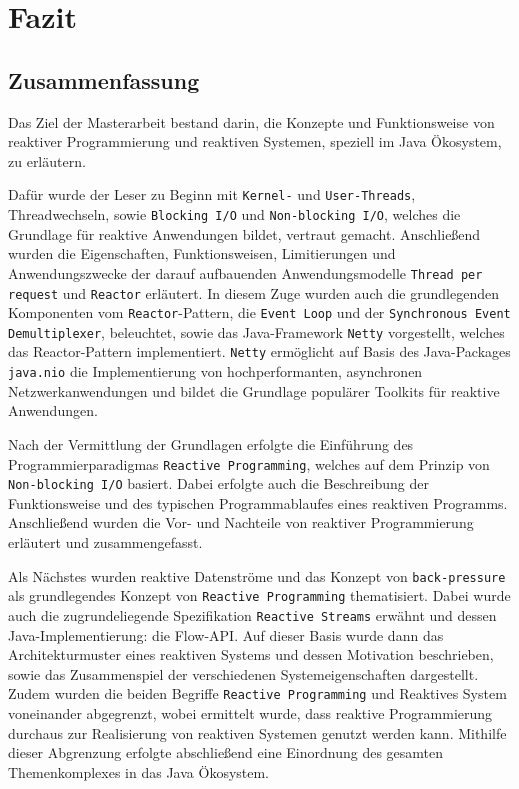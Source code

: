 \section{Fazit}
\label{sec:fazit}
\subsection{Zusammenfassung}
\label{subsec:zusammenfassung}
Das Ziel der Masterarbeit bestand darin, die Konzepte und Funktionsweise von reaktiver Programmierung und reaktiven Systemen, speziell im Java Ökosystem,
zu erläutern.

Dafür wurde der Leser zu Beginn mit \verb|Kernel-| und \verb|User-Threads|,
Threadwechseln, sowie \verb|Blocking I/O| und \verb|Non-blocking I/O|, welches die Grundlage
für reaktive Anwendungen bildet, vertraut gemacht.
Anschließend wurden die Eigenschaften, Funktionsweisen, Limitierungen und Anwendungszwecke der darauf aufbauenden Anwendungsmodelle
\verb|Thread per request| und \verb|Reactor| erläutert. In diesem Zuge wurden auch die grundlegenden Komponenten vom \verb|Reactor|-Pattern,
die \verb|Event Loop| und der \verb|Synchronous Event Demultiplexer|, beleuchtet, sowie das Java-Framework \verb|Netty| vorgestellt, welches
das Reactor-Pattern implementiert.
\verb|Netty| ermöglicht auf Basis des Java-Packages \verb|java.nio| die Implementierung von
hochperformanten, asynchronen Netzwerkanwendungen und bildet die Grundlage populärer Toolkits für reaktive Anwendungen.\newline

Nach der Vermittlung der Grundlagen erfolgte die Einführung des Programmierparadigmas \verb|Reactive Programming|, welches
auf dem Prinzip von \verb|Non-blocking I/O| basiert. Dabei erfolgte auch die Beschreibung der Funktionsweise und des typischen Programmablaufes
eines reaktiven Programms.
Anschließend wurden die Vor- und Nachteile von reaktiver Programmierung erläutert und zusammengefasst.

Als Nächstes wurden reaktive Datenströme und das Konzept von \verb|back-pressure| als grundlegendes Konzept von \verb|Reactive Programming|
thematisiert. Dabei wurde auch die zugrundeliegende Spezifikation \verb|Reactive Streams| erwähnt und dessen Java-Implementierung: die Flow-API.
Auf dieser Basis wurde dann das Architekturmuster eines reaktiven Systems und dessen Motivation beschrieben, sowie
das Zusammenspiel der verschiedenen Systemeigenschaften dargestellt. Zudem wurden die beiden Begriffe \verb|Reactive Programming| und Reaktives System
voneinander abgegrenzt, wobei ermittelt wurde, dass reaktive Programmierung durchaus zur Realisierung von reaktiven Systemen genutzt werden kann.
Mithilfe dieser Abgrenzung erfolgte abschließend eine Einordnung des gesamten Themenkomplexes in das Java Ökosystem.


